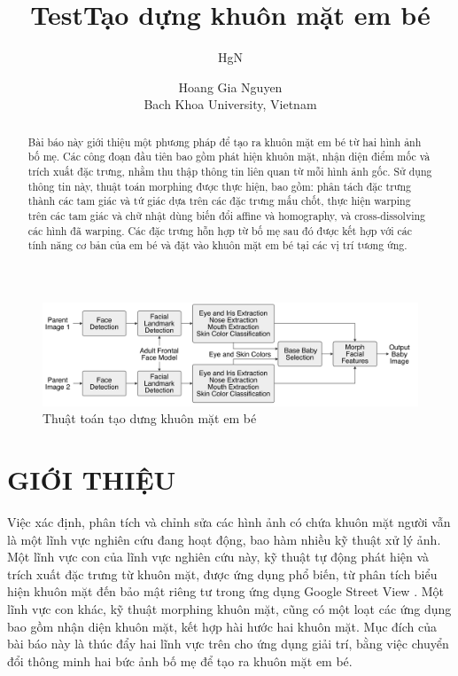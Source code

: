 \documentclass[journal]{IEEEtran}
\title{Test}
\author{HgN}
\begin{document}
\title{Tạo dựng khuôn mặt em bé}
\author{Hoang Gia Nguyen\\
Bach Khoa University, Vietnam\\}

\maketitle

\begin{center}
    \begin{figure}[!ht]
    \begin{center}
     \includegraphics[scale=1]{Images/44}
    \end{center}
    \caption{Thuật toán tạo dưng khuôn mặt em bé}
    \label{refhinh1}
    \end{figure}
\end{center}

\begin{abstract}

Bài báo này giới thiệu một phương pháp để tạo ra khuôn mặt em bé từ hai hình ảnh bố mẹ. Các công đoạn đầu tiên bao gồm phát hiện khuôn mặt, nhận diện điểm mốc và trích xuất đặc trưng, nhằm thu thập thông tin liên quan từ mỗi hình ảnh gốc. Sử dụng thông tin này, thuật toán morphing được thực hiện, bao gồm: phân tách đặc trưng thành các tam giác và tứ giác dựa trên các đặc trưng mấu chốt, thực hiện warping trên các tam giác và chữ nhật dùng biến đổi affine và homography, và cross-dissolving các hình đã warping. Các đặc trưng hỗn hợp từ bố mẹ sau đó được kết hợp với các tính năng cơ bản của em bé và đặt vào khuôn mặt em bé tại các vị trí tương ứng.

\end{abstract}

\IEEEpeerreviewmaketitle

\section{GIỚI THIỆU}

Việc xác định, phân tích và chỉnh sửa các hình ảnh có chứa khuôn mặt người vẫn là một lĩnh vực nghiên cứu đang hoạt động, bao hàm nhiều kỹ thuật xử lý ảnh. Một lĩnh vực con của lĩnh vực nghiên cứu này, kỹ thuật tự động phát hiện và trích xuất đặc trưng từ khuôn mặt, được ứng dụng phổ biến, từ phân tích biểu hiện khuôn mặt đến bảo mật riêng tư trong ứng dụng Google Street View \cite{ref:r1}. Một lĩnh vực con khác, kỹ thuật morphing khuôn mặt, cũng có một loạt các ứng dụng bao gồm nhận diện khuôn mặt, kết hợp hài hước hai khuôn mặt. Mục đích của bài báo này là thúc đẩy hai lĩnh vực trên cho ứng dụng giải trí, bằng việc chuyển đổi thông minh hai bức ảnh bố mẹ để tạo ra khuôn mặt em bé.
\end{document}
